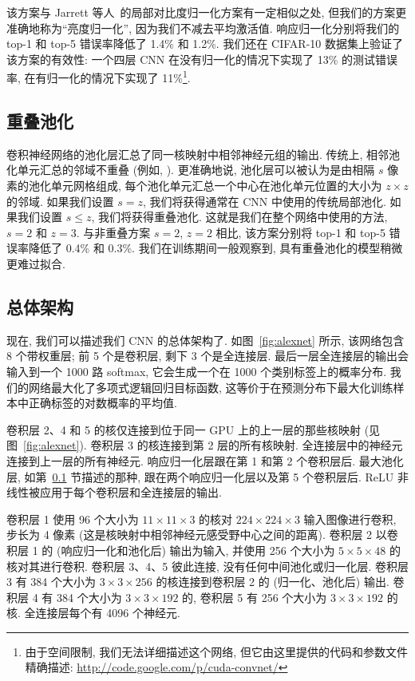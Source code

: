 \documentclass{article} %
\begin{document}
该方案与 Jarrett 等人~\cite{jarrett2009}的局部对比度归一化方案有一定相似之处, 但我们的方案更准确地称为“亮度归一化”, 因为我们不减去平均激活值. 响应归一化分别将我们的 top-1 和 top-5 错误率降低了 1.4\% 和 1.2\%. 我们还在 CIFAR-10 数据集上验证了该方案的有效性: 一个四层 CNN 在没有归一化的情况下实现了 13\% 的测试错误率, 在有归一化的情况下实现了 11\%\footnote{由于空间限制, 我们无法详细描述这个网络, 但它由这里提供的代码和参数文件精确描述: \url{http://code.google.com/p/cuda-convnet/}}.

\vspace{-1mm}
\subsection{重叠池化}
\label{subsec:pool}
\vspace{-2ex}
卷积神经网络的池化层汇总了同一核映射中相邻神经元组的输出. 传统上, 相邻池化单元汇总的邻域不重叠 (例如, \cite{lecun2009, jarrett2009, cire2012}). 更准确地说, 池化层可以被认为是由相隔 $s$ 像素的池化单元网格组成, 每个池化单元汇总一个中心在池化单元位置的大小为 $z \times z$ 的邻域. 如果我们设置 $s = z$, 我们将获得通常在 CNN 中使用的传统局部池化. 如果我们设置 $s \le z$, 我们将获得重叠池化. 这就是我们在整个网络中使用的方法, $s = 2$ 和 $z = 3$. 与非重叠方案 $s = 2$, $z = 2$ 相比, 该方案分别将 top-1 和 top-5 错误率降低了 0.4\% 和 0.3\%. 我们在训练期间一般观察到, 具有重叠池化的模型稍微更难过拟合.

\vspace{-2mm}
\subsection{总体架构}
\label{subsec:arch}
\vspace{-2ex}
现在, 我们可以描述我们 CNN 的总体架构了. 如图~\ref{fig:alexnet} 所示, 该网络包含 8 个带权重层; 前 5 个是卷积层, 剩下 3 个是全连接层. 最后一层全连接层的输出会输入到一个 1000 路 softmax, 它会生成一个在 1000 个类别标签上的概率分布. 我们的网络最大化了多项式逻辑回归目标函数, 这等价于在预测分布下最大化训练样本中正确标签的对数概率的平均值.

卷积层 2、4 和 5 的核仅连接到位于同一 GPU 上的上一层的那些核映射 (见图~\ref{fig:alexnet}). 卷积层 3 的核连接到第 2 层的所有核映射. 全连接层中的神经元连接到上一层的所有神经元. 响应归一化层跟在第 1 和第 2 个卷积层后. 最大池化层, 如第~\ref{subsec:pool} 节描述的那种, 跟在两个响应归一化层以及第 5 个卷积层后. ReLU 非线性被应用于每个卷积层和全连接层的输出.

卷积层 1 使用 96 个大小为 $11\times 11 \times 3$ 的核对 $224 \times 224 \times 3$ 输入图像进行卷积, 步长为 4 像素 (这是核映射中相邻神经元感受野中心之间的距离). 卷积层 2 以卷积层 1 的 (响应归一化和池化后) 输出为输入, 并使用 256 个大小为 $5 \times 5 \times 48$ 的核对其进行卷积. 卷积层 3、4、5 彼此连接, 没有任何中间池化或归一化层. 卷积层 3 有 384 个大小为 $3 \times 3 \times 256$ 的核连接到卷积层 2 的 (归一化、池化后) 输出. 卷积层 4 有 384 个大小为 $3 \times 3 \times 192$ 的, 卷积层 5 有 256 个大小为 $3 \times 3 \times 192$ 的核. 全连接层每个有 4096 个神经元.
\end{document}
